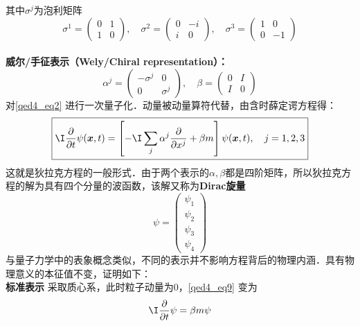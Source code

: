 其中$\sigma^{j}$为泡利矩阵
\begin{equation}\label{qed4_eq7}
\sigma^{1}=\left(\begin{array}{ll}
0 & 1 \\
1 & 0
\end{array}\right), \quad \sigma^{2}=\left(\begin{array}{rr}
0 & -i \\
i & 0
\end{array}\right), \quad \sigma^{3}=\left(\begin{array}{rr}
1 & 0 \\
0 & -1
\end{array}\right)
\end{equation}
\\\textbf{威尔/手征表示（Wely/Chiral representation）：}
\begin{equation}\label{qed4_eq8}
\alpha^{j}=\left(\begin{array}{cc}
-\sigma^{j} & 0 \\
0 & \sigma^{j}
\end{array}\right), \quad \beta=\left(\begin{array}{cc}
0 & I \\
I & 0
\end{array}\right)
\end{equation}
对\autoref{qed4_eq2} 进行一次量子化．动量被动量算符代替，由含时薛定谔方程得：\begin{equation}\label{qed4_eq9}
\boxed{ \I \frac{\partial}{\partial t} \psi(\boldsymbol{x}, t)=\left[- \I \sum_{j} \alpha^{j} \frac{\partial}{\partial x^{j}}+\beta m\right] \psi(\boldsymbol{x}, t), \quad j=1,2,3}
\end{equation}
这就是狄拉克方程的一般形式．由于两个表示的$\alpha,\beta$都是四阶矩阵，所以狄拉克方程的解为具有四个分量的波函数，该解又称为\textbf{Dirac旋量}
\begin{equation}\label{qed4_eq10}
\psi=\left(\begin{array}{l}
\psi_{1} \\
\psi_{2} \\
\psi_{3} \\
\psi_{4}
\end{array}\right)
\end{equation}
与量子力学中的表象概念类似，不同的表示并不影响方程背后的物理内涵．具有物理意义的本征值不变，证明如下：
\\\textbf{标准表示}
采取质心系，此时粒子动量为0，\autoref{qed4_eq9} 变为
\begin{equation}\label{qed4_eq11}
 \I \frac{\partial}{\partial t} \psi= \beta m\psi
\end{equation}
